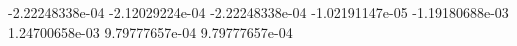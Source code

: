  -2.22248338e-04
 -2.12029224e-04
 -2.22248338e-04
 -1.02191147e-05
 -1.19180688e-03
 1.24700658e-03
 9.79777657e-04
 9.79777657e-04
